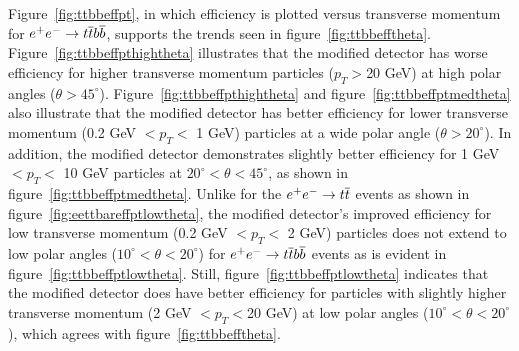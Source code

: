 Figure~\ref{fig:ttbbeffpt}, in which efficiency is plotted versus transverse momentum for $\ee \rightarrow \ttbar \bbbar$,
supports the trends seen in figure~\ref{fig:ttbbefftheta}.
Figure~\ref{fig:ttbbeffpthightheta} illustrates that
the modified detector has worse efficiency for 
higher transverse momentum particles ($p_{T} > $20 GeV)
at high polar angles ($\theta > 45^{\circ}$).
Figure~\ref{fig:ttbbeffpthightheta} and figure~\ref{fig:ttbbeffptmedtheta} also illustrate 
that the modified detector has better efficiency for
 lower transverse momentum (0.2 GeV $< p_{T} <$ 1 GeV) particles at a wide polar angle ($\theta > 20^{\circ}$).
In addition, the modified detector demonstrates slightly better efficiency 
for 1 GeV $< p_{T} <$ 10 GeV particles at $20^{\circ} < \theta < 45^{\circ}$,
as shown in figure~\ref{fig:ttbbeffptmedtheta}.
Unlike for the $\ee \rightarrow \ttbar$ events as shown in figure~\ref{fig:eettbareffptlowtheta}, the modified detector's improved efficiency
for low transverse momentum (0.2 GeV $< p_{T} <$ 2 GeV)  particles does not extend to low polar angles ($10^{\circ} < \theta < 20^{\circ}$)
for $\ee \rightarrow \ttbar \bbbar$ events
as is evident in  figure~\ref{fig:ttbbeffptlowtheta}.
Still, figure~\ref{fig:ttbbeffptlowtheta} indicates that the modified detector does have better
efficiency for particles with slightly higher transverse momentum (2 GeV $< p_{T}<$20 GeV)
at low polar angles ($10^{\circ} < \theta < 20^{\circ}$), which agrees with figure~\ref{fig:ttbbefftheta}.
